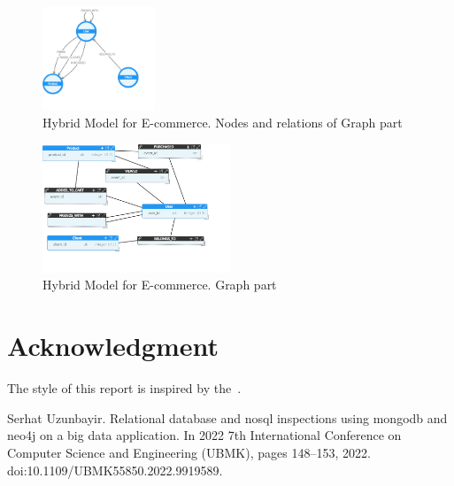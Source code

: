 \documentclass[conference]{IEEEtran}
\begin{document}
\begin{figure}[htbp]
    \centerline{\includegraphics[width=0.3\textwidth]{../screenshots/Neo4jModelOptimal.png}}
    \caption{Hybrid Model for E-commerce. Nodes and relations of Graph part}\label{fig:neo4j_optimal}
\end{figure}

\begin{figure}[htbp]
    \centerline{\includegraphics[width=0.5\textwidth]{../screenshots/Neo4jModelEROptimal.png}}
    \caption{Hybrid Model for E-commerce. Graph part}\label{fig:neo4j_eroptimal}
\end{figure}

\section*{Acknowledgment}

The style of this report is inspired by the~\cite{uzunbayir}.


\begin{thebibliography}{00}
     Serhat Uzunbayir. Relational database and nosql inspections using mongodb and neo4j on a big data application.
    In 2022 7th International Conference on Computer Science and Engineering (UBMK), pages 148--153, 2022.
    doi:10.1109/UBMK55850.2022.9919589.
\end{thebibliography}
\end{document}

